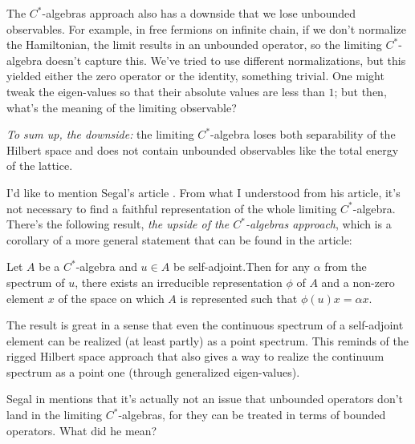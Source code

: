 The $C^*$-algebras approach also has a downside that we lose unbounded observables. For example, in free fermions on infinite chain, if we don't normalize the Hamiltonian, the limit results in an unbounded operator, so the limiting $C^*$-algebra doesn't capture this. We've tried to use different normalizations, but this yielded either the zero operator or the identity, something trivial. One might tweak the eigen-values so that their absolute values are less than $1$; but then, what's the meaning of the limiting observable?

\emph{To sum up, the downside:} the limiting $C^*$-algebra loses both separability of the Hilbert space and does not contain unbounded observables like the total energy of the lattice.

I'd like to mention Segal's article \cite{segal}. From what I understood from his article, it's not necessary to find a faithful representation of the whole limiting $C^*$-algebra. There's the following result, \emph{the upside of the $C^*$-algebras approach}, which is a corollary of a more general statement that can be found in the article:
\begin{statement}
Let $A$ be a $C^*$-algebra and $u \in A$ be self-adjoint.Then for any $\alpha$ from the spectrum of $u$, there exists an irreducible representation $\phi$ of $A$ and a non-zero element $x$ of the space on which $A$ is represented such that $\phi(u)x = \alpha x$.
\end{statement}
The result is great in a sense that even the continuous spectrum of a self-adjoint element can be realized (at least partly) as a point spectrum. This reminds of the rigged Hilbert space approach that also gives a way to realize the continuum spectrum as a point one (through generalized eigen-values).


\begin{fur}
Segal in \cite{segal} mentions that it's actually not an issue that unbounded operators don't land in the limiting $C^*$-algebras, for they can be treated in terms of bounded operators. What did he mean?
\end{fur}